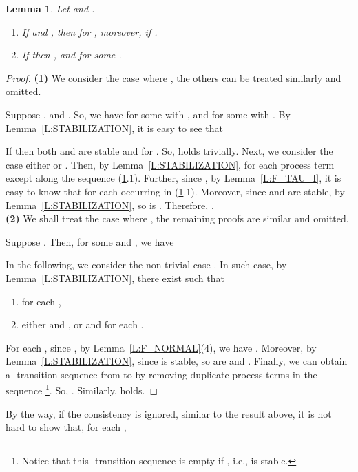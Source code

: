 \documentclass{elsarticle}
\theoremstyle{plain}
\newtheorem{lemma}[theorem]{Lemma}
\theoremstyle{definition}
\begin{document}
\begin{lemma}\label{L:TAU_I}
  Let  and .
    \begin{enumerate}
      \item If  and , then   for ,
           moreover,  if .
      \item If  then ,  and  for some .
    \end{enumerate}
\end{lemma}
\begin{proof}
\noindent\textbf{(1)} We consider the case where , the others can be treated similarly and omitted.

Suppose ,  and .
So, we have  for some  with , and  for some  with .
    By Lemma~\ref{L:STABILIZATION}, it is easy to see that
    
    If  then both  and  are stable and  for .
    So,  holds trivially.
    Next, we consider the case either  or .
    Then, by Lemma~\ref{L:STABILIZATION},  for each process term  except  along the sequence (\ref{L:TAU_I}.1).
    Further, since , by Lemma~\ref{L:F_TAU_I}, it is easy to know that   for each  occurring in (\ref{L:TAU_I}.1).
    Moreover, since  and  are stable, by Lemma~\ref{L:STABILIZATION}, so is .
    Therefore, .\\

\noindent \textbf{(2)}
    We shall treat the case where , the remaining proofs are similar and omitted.

    Suppose . Then, for some  and , we have
    
     In the following, we consider the non-trivial case . In such case, by Lemma~\ref{L:STABILIZATION}, there exist  such that
     \begin{enumerate}
       \item   for each  ,
       \item either  and , or   and   for each .
     \end{enumerate}

     For each , since , by Lemma~\ref{L:F_NORMAL}(4), we have . Moreover, by Lemma~\ref{L:STABILIZATION}, since  is stable, so are  and . Finally, we can obtain a -transition sequence from  to  by removing duplicate process terms in the sequence  \footnote{Notice that this -transition sequence is empty if , i.e.,  is stable.}.
     So, .
     Similarly,  holds.
\end{proof}

By the way, if the consistency is ignored, similar to the result above, it is not hard to show that, for each ,
\end{document}
